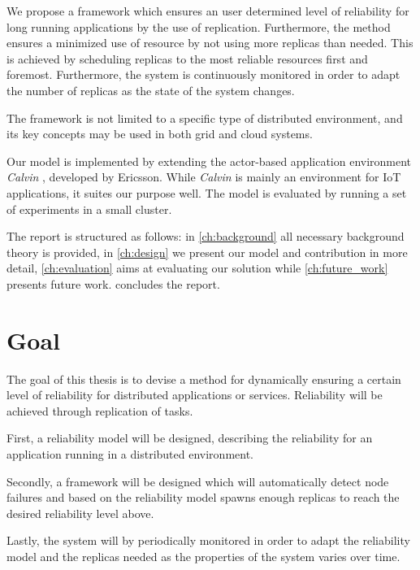 \documentclass{cslthse-msc}
\begin{document}
We propose a framework which ensures an user determined level of reliability for long running applications by the use of replication. Furthermore, the method ensures a minimized use of resource by not using more replicas than needed. This is achieved by scheduling replicas to the most reliable resources first and foremost. Furthermore, the system is continuously monitored in order to adapt the number of replicas as the state of the system changes.

The framework is not limited to a specific type of distributed environment, and its key concepts may be used in both grid and cloud systems.


Our model is implemented by extending the actor-based application environment \emph{Calvin} \cite{calvin}, developed by Ericsson. While \emph{Calvin} is mainly an environment for IoT applications, it suites our purpose well. The model is evaluated by running a set of experiments in a small cluster. %

The report is structured as follows: in \cref{ch:background} all necessary background theory is provided, in \cref{ch:design} we present our model and contribution in more detail, \cref{ch:evaluation} aims at evaluating our solution while \cref{ch:future_work} presents future work.  concludes the report. 

\section{Goal} \label{sec:introduction_goals}
The goal of this thesis is to devise a method for dynamically ensuring a certain level of reliability for distributed applications or services. Reliability will be achieved through replication of tasks.

First, a reliability model will be designed, describing the reliability for an application running in a distributed environment.

Secondly, a framework will be designed which will automatically detect node failures and based on the reliability model spawns enough replicas to reach the desired reliability level above.

Lastly, the system will by periodically monitored in order to adapt the reliability model and the replicas needed as the properties of the system varies over time.
\end{document}
